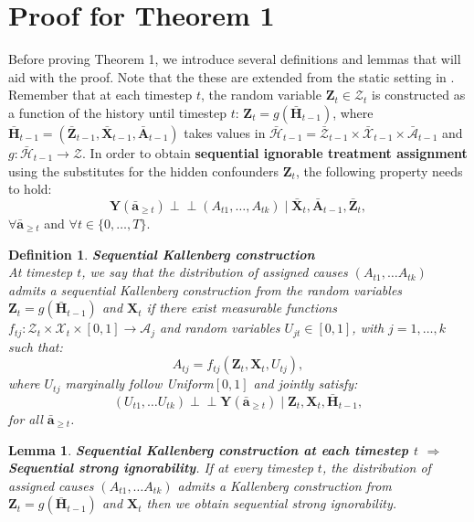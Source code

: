 \documentclass{article}
\newtheorem{lemma}{Lemma}
\newtheorem{definition}{Definition}
\newcommand{\vc}[1]{\mathbf{#1}}
\newcommand{\ci}{\perp\!\!\!\perp}
\newcommand{\cl}[1]{\mathcal{#1}}
\newcommand{\hist}[1]{\bar{\vc{#1}}}
\newcommand{\histcl}[1]{\bar{\cl{#1}}}
\begin{document}
   	\section{Proof for Theorem 1} \label{apx:proof_th_1}
	
	Before proving Theorem 1, we introduce several definitions and lemmas that will aid with the proof. Note that the these are extended from the static setting in \citet{wang2018blessings}. Remember that at each timestep $t$, the random variable $\vc{Z}_t \in \cl{Z}_t$ is constructed as a function of the history until timestep $t$: $\vc{Z}_t = g(\hist{H}_{t-1})$, where $\hist{H}_{t-1} = (\hist{Z}_{t-1}, \hist{X}_{t-1}, \hist{A}_{t-1})$ takes values in $\bar{\cl{H}}_{t-1} = \bar{\cl{Z}}_{t-1} \times \bar{\cl{X}}_{t-1} \times \bar{\cl{A}}_{t-1}$ and $g: \histcl{H}_{t-1} \rightarrow \cl{Z}$. In order to obtain \textbf{sequential ignorable treatment assignment} using the substitutes for the hidden confounders $\vc{Z}_t$, the following property needs to hold:
	\begin{equation}
	\vc{Y}(\bar{\vc{a}}_{\geq t})  \ci (A_{t1}, \dots, A_{tk}) \mid \bar{\vc{X}}_{t},  \bar{\vc{A}}_{t-1}, \bar{\vc{Z}}_{t},
	\end{equation}
	$ \forall \hist{a}_{\geq t}$ and $\forall t\in \{0, \dots, T\}$.
	
	\begin{definition}
	\textbf{Sequential Kallenberg construction} \\
	At timestep $t$, we say that the distribution of assigned causes $(A_{t1}, \dots A_{tk})$ admits a sequential Kallenberg construction from the random variables  $\vc{Z}_t = g(\hist{H}_{t-1})$ and $\vc{X}_t$ if there exist measurable functions $f_{tj}: \cl{Z}_t \times \cl{X}_t \times [0, 1] \rightarrow \cl{A}_j$ and random variables $U_{jt}\in [0, 1]$, with $ j = 1, \dots, k$ such that:
	\begin{equation}
	A_{tj} = f_{tj}(\vc{Z}_t, \vc{X}_{t}, U_{tj}),
	\end{equation}
	where $U_{tj}$ marginally follow Uniform$[0, 1]$ and jointly satisfy: 
	\begin{equation}
	(U_{t1}, \dots U_{tk}) \ci  \vc{Y}(\hist{a}_{\geq t}) \mid \vc{Z}_t, \vc{X}_{t}, \hist{H}_{t-1}, 
	\end{equation}
	for all $\hist{a}_{\geq t}$. 
	\end{definition}
	
	\begin{lemma}
	\textbf{Sequential Kallenberg construction at each timestep $t$ $\Rightarrow$ Sequential strong ignorability}. If at every timestep $t$, the distribution of assigned causes $(A_{t1}, \dots A_{tk})$ admits a Kallenberg construction from $\vc{Z}_t = g(\hist{H}_{t-1})$ and $\vc{X}_t$ then we obtain sequential strong ignorability. 
	\end{lemma}
	
\end{document}
